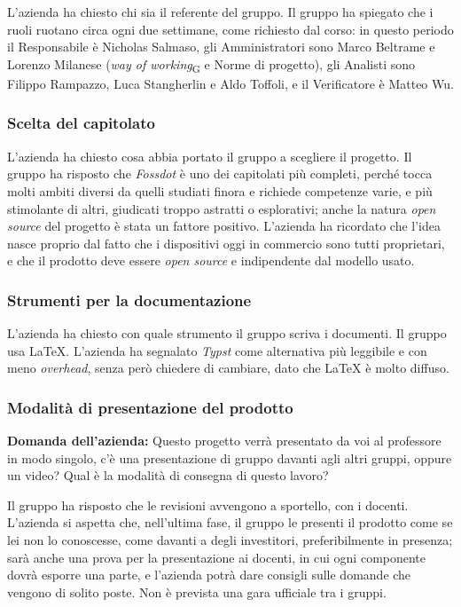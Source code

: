 \documentclass[12pt,a4paper]{article}
\newcommand{\gl}[1]{\emph{#1}\textsubscript{\scriptsize G}}
\begin{document}
L'azienda ha chiesto chi sia il referente del gruppo. Il gruppo ha spiegato che i ruoli ruotano circa ogni due settimane, come richiesto dal corso: in questo periodo il Responsabile è Nicholas Salmaso, gli Amministratori sono Marco Beltrame e Lorenzo Milanese (\gl{way of working} e Norme di progetto), gli Analisti sono Filippo Rampazzo, Luca Stangherlin e Aldo Toffoli, e il Verificatore è Matteo Wu.

\subsubsection{Scelta del capitolato}

L'azienda ha chiesto cosa abbia portato il gruppo a scegliere il progetto. Il gruppo ha risposto che \emph{Fossdot} è uno dei capitolati più completi, perché tocca molti ambiti diversi da quelli studiati finora e richiede competenze varie, e più stimolante di altri, giudicati troppo astratti o esplorativi; anche la natura \emph{open source} del progetto è stata un fattore positivo. L'azienda ha ricordato che l'idea nasce proprio dal fatto che i dispositivi oggi in commercio sono tutti proprietari, e che il prodotto deve essere \emph{open source} e indipendente dal modello usato.

\subsubsection{Strumenti per la documentazione}

L'azienda ha chiesto con quale strumento il gruppo scriva i documenti. Il gruppo usa \LaTeX{}. L'azienda ha segnalato \emph{Typst} come alternativa più leggibile e con meno \emph{overhead}, senza però chiedere di cambiare, dato che \LaTeX{} è molto diffuso.

\subsubsection{Modalità di presentazione del prodotto}

\textbf{Domanda dell'azienda:} Questo progetto verrà presentato da voi al professore in modo singolo, c'è una presentazione di gruppo davanti agli altri gruppi, oppure un video? Qual è la modalità di consegna di questo lavoro?

Il gruppo ha risposto che le revisioni avvengono a sportello, con i docenti. L'azienda si aspetta che, nell'ultima fase, il gruppo le presenti il prodotto come se lei non lo conoscesse, come davanti a degli investitori, preferibilmente in presenza; sarà anche una prova per la presentazione ai docenti, in cui ogni componente dovrà esporre una parte, e l'azienda potrà dare consigli sulle domande che vengono di solito poste. Non è prevista una gara ufficiale tra i gruppi.
\end{document}
